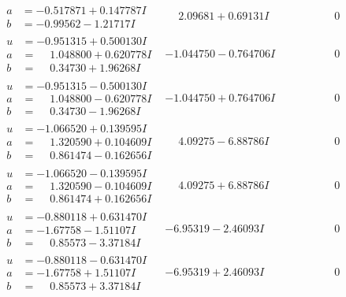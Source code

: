 \documentclass[1p]{elsarticle_modified}
\theoremstyle{definition}
\begin{document}
$$\begin{array}{c|c|c}
\begin{aligned}
a &= -0.517871 + 0.147787 I \\
b &= -0.99562 - 1.21717 I\end{aligned}
 & \phantom{-}2.09681 + 0.69131 I & \phantom{-0.000000 } 0 \\ \hline\begin{aligned}
u &= -0.951315 + 0.500130 I \\
a &= \phantom{-}1.048800 + 0.620778 I \\
b &= \phantom{-}0.34730 + 1.96268 I\end{aligned}
 & -1.044750 - 0.764706 I & \phantom{-0.000000 } 0 \\ \hline\begin{aligned}
u &= -0.951315 - 0.500130 I \\
a &= \phantom{-}1.048800 - 0.620778 I \\
b &= \phantom{-}0.34730 - 1.96268 I\end{aligned}
 & -1.044750 + 0.764706 I & \phantom{-0.000000 } 0 \\ \hline\begin{aligned}
u &= -1.066520 + 0.139595 I \\
a &= \phantom{-}1.320590 + 0.104609 I \\
b &= \phantom{-}0.861474 - 0.162656 I\end{aligned}
 & \phantom{-}4.09275 - 6.88786 I & \phantom{-0.000000 } 0 \\ \hline\begin{aligned}
u &= -1.066520 - 0.139595 I \\
a &= \phantom{-}1.320590 - 0.104609 I \\
b &= \phantom{-}0.861474 + 0.162656 I\end{aligned}
 & \phantom{-}4.09275 + 6.88786 I & \phantom{-0.000000 } 0 \\ \hline\begin{aligned}
u &= -0.880118 + 0.631470 I \\
a &= -1.67758 - 1.51107 I \\
b &= \phantom{-}0.85573 - 3.37184 I\end{aligned}
 & -6.95319 - 2.46093 I & \phantom{-0.000000 } 0 \\ \hline\begin{aligned}
u &= -0.880118 - 0.631470 I \\
a &= -1.67758 + 1.51107 I \\
b &= \phantom{-}0.85573 + 3.37184 I\end{aligned}
 & -6.95319 + 2.46093 I & \phantom{-0.000000 } 0 \\ \hline\begin{aligned}

\end{aligned}
\end{array}$$
\end{document}
